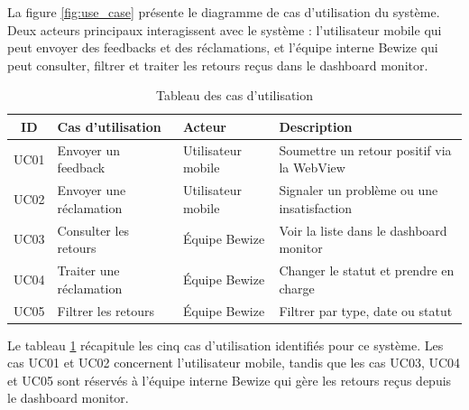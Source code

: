 La figure \ref{fig:use_case} présente le diagramme de cas d'utilisation 
du système. Deux acteurs principaux interagissent avec le système : 
l'utilisateur mobile qui peut envoyer des feedbacks et des réclamations, 
et l'équipe interne Bewize qui peut consulter, filtrer et traiter 
les retours reçus dans le dashboard monitor.

\begin{table}[H]
\centering
\caption{Tableau des cas d'utilisation}
\label{tab:use_case}
\renewcommand{\arraystretch}{1.8}
\begin{tabular}{|c|p{4cm}|p{3cm}|p{5cm}|}
\hline
\textbf{ID} & \textbf{Cas d'utilisation} & \textbf{Acteur} & 
\textbf{Description} \\
\hline
UC01 & Envoyer un feedback & Utilisateur mobile & 
Soumettre un retour positif via la WebView \\
\hline
UC02 & Envoyer une réclamation & Utilisateur mobile & 
Signaler un problème ou une insatisfaction \\
\hline
UC03 & Consulter les retours & Équipe Bewize & 
Voir la liste dans le dashboard monitor \\
\hline
UC04 & Traiter une réclamation & Équipe Bewize & 
Changer le statut et prendre en charge \\
\hline
UC05 & Filtrer les retours & Équipe Bewize & 
Filtrer par type, date ou statut \\
\hline
\end{tabular}
\end{table}

Le tableau \ref{tab:use_case} récapitule les cinq cas d'utilisation 
identifiés pour ce système. Les cas UC01 et UC02 concernent l'utilisateur 
mobile, tandis que les cas UC03, UC04 et UC05 sont réservés à l'équipe 
interne Bewize qui gère les retours reçus depuis le dashboard monitor.

